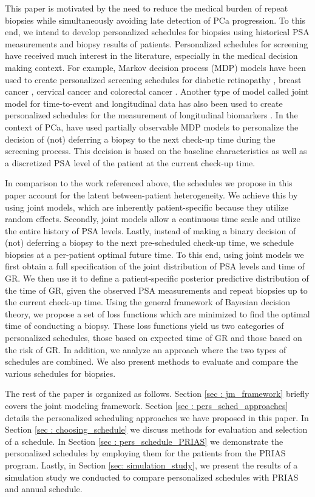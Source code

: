 This paper is motivated by the need to reduce the medical burden of repeat biopsies while simultaneously avoiding late detection of PCa progression. To this end, we intend to develop personalized schedules for biopsies using historical PSA measurements and biopsy results of patients. Personalized schedules for screening have received much interest in the literature, especially in the medical decision making context. For example, Markov decision process (MDP) models have been used to create personalized screening schedules for diabetic retinopathy \citep{bebu2017OptimalScreening}, breast cancer \citep*{ayer2012or}, cervical cancer \citep*{akhavan2017markov} and colorectal cancer \citep*{erenay2014optimizing}. Another type of model called joint model for time-to-event and longitudinal data \citep{tsiatis2004joint,rizopoulos2012joint} has also been used to create personalized schedules for the measurement of longitudinal biomarkers \citep{drizopoulosPersScreening}. In the context of PCa, \citet{zhang2012optimization} have used partially observable MDP models to personalize the decision of (not) deferring a biopsy to the next check-up time during the screening process. This decision is based on the baseline characteristics as well as a discretized PSA level of the patient at the current check-up time.

In comparison to the work referenced above, the schedules we propose in this paper account for the latent between-patient heterogeneity. We achieve this by using joint models, which are inherently patient-specific because they utilize random effects. Secondly, joint models allow a continuous time scale and utilize the entire history of PSA levels. Lastly, instead of making a binary decision of (not) deferring a biopsy to the next pre-scheduled check-up time, we schedule biopsies at a per-patient optimal future time. To this end, using joint models we first obtain a full specification of the joint distribution of PSA levels and time of GR. We then use it to define a patient-specific posterior predictive distribution of the time of GR, given the observed PSA measurements and repeat biopsies up to the current check-up time. Using the general framework of Bayesian decision theory, we propose a set of loss functions which are minimized to find the optimal time of conducting a biopsy. These loss functions yield us two categories of personalized schedules, those based on expected time of GR and those based on the risk of GR. In addition, we analyze an approach where the two types of schedules are combined. We also present methods to evaluate and compare the various schedules for biopsies.

The rest of the paper is organized as follows. Section \ref{sec : jm_framework} briefly covers the joint modeling framework. Section \ref{sec : pers_sched_approaches} details the personalized scheduling approaches we have proposed in this paper. In Section \ref{sec : choosing_schedule} we discuss methods for evaluation and selection of a schedule. In Section \ref{sec : pers_schedule_PRIAS} we demonstrate the personalized schedules by employing them for the patients from the PRIAS program. Lastly, in Section \ref{sec: simulation_study}, we present the results of a simulation study we conducted to compare personalized schedules with PRIAS and annual schedule.